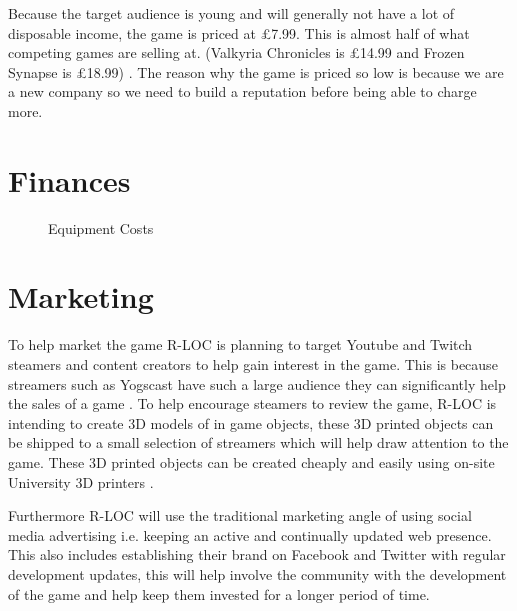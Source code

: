 \documentclass{scrartcl}
\begin{document}
Because the target audience is young and will generally not have a lot of disposable income, the game is priced at \pounds 7.99. This is almost half of what competing games are selling at. (Valkyria Chronicles is \pounds 14.99 and Frozen Synapse is \pounds 18.99) \cite{Valkyria, Frozen}. The reason why the game is priced so low is because we are a new company so we need to build a reputation before being able to charge more.



\section{Finances}
\begin{figure}[h]
	\caption{Equipment Costs	}
\end{figure}

\section{Marketing}
To help market the game R-LOC is planning to target Youtube and Twitch steamers and content creators to help gain interest in the game. 
This is because streamers such as Yogscast have such a large audience they can significantly help the sales of a game \cite{Hoggins, Rose}.  To help encourage steamers to review the game, R-LOC is intending to create 3D models of in game objects, these 3D printed objects can be shipped to a small selection of streamers which will help draw attention to the game. These 3D printed objects can be created cheaply and easily using on-site University 3D printers \cite{Rose}.

Furthermore R-LOC will use the traditional marketing angle of using social media advertising i.e. keeping an active and continually updated web presence. 
This also includes establishing their brand on Facebook and Twitter with regular development updates, this will help involve the community with the development of the game and help keep them invested for a longer period of time.
\end{document}

